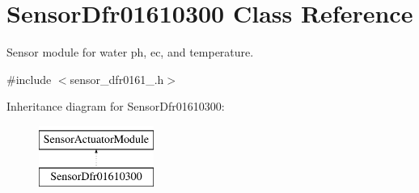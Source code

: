 \hypertarget{class_sensor_dfr01610300}{}\section{Sensor\+Dfr01610300 Class Reference}
\label{class_sensor_dfr01610300}


Sensor module for water ph, ec, and temperature.  




{\ttfamily \#include $<$sensor\+\_\+dfr0161\+\_.\+h$>$}

Inheritance diagram for Sensor\+Dfr01610300\+:\begin{figure}[H]
\begin{center}
\leavevmode
\includegraphics[height=2.000000cm]{class_sensor_dfr01610300}
\end{center}
\end{figure}
